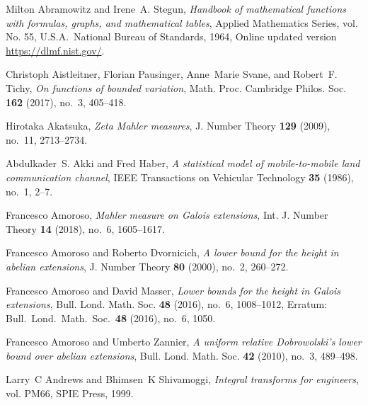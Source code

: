 \documentclass[12pt,reqno]{amsart}
\theoremstyle{definition}
\theoremstyle{plain}
\theoremstyle{definition}
\begin{document}

\providecommand{\bysame}{\leavevmode\hbox to3em{\hrulefill}\thinspace}
\providecommand{\MR}{\relax\ifhmode\unskip\space\fi MR }
\providecommand{\MRhref}[2]{%
  \href{http://www.ams.org/mathscinet-getitem?mr=#1}{#2}
}
\providecommand{\href}[2]{#2}
\begin{thebibliography}{100}

Milton Abramowitz and Irene~A. Stegun, \emph{Handbook of mathematical functions
  with formulas, graphs, and mathematical tables}, Applied Mathematics Series,
  vol. No. 55, U.S.A.~National Bureau of Standards, 1964, Online updated
  version \url{https://dlmf.nist.gov/}.

Christoph Aistleitner, Florian Pausinger, Anne~Marie Svane, and Robert~F.
  Tichy, \emph{On functions of bounded variation}, Math. Proc. Cambridge
  Philos. Soc. \textbf{162} (2017), no.~3, 405--418.

Hirotaka Akatsuka, \emph{Zeta {M}ahler measures}, J. Number Theory \textbf{129}
  (2009), no.~11, 2713--2734.

Abdulkader~S. Akki and Fred Haber, \emph{A statistical model of
  mobile-to-mobile land communication channel}, IEEE Transactions on Vehicular
  Technology \textbf{35} (1986), no.~1, 2--7.

Francesco Amoroso, \emph{Mahler measure on {G}alois extensions}, Int. J. Number
  Theory \textbf{14} (2018), no.~6, 1605--1617.

Francesco Amoroso and Roberto Dvornicich, \emph{A lower bound for the height in
  abelian extensions}, J. Number Theory \textbf{80} (2000), no.~2, 260--272.

Francesco Amoroso and David Masser, \emph{Lower bounds for the height in
  {G}alois extensions}, Bull. Lond. Math. Soc. \textbf{48} (2016), no.~6,
  1008--1012, Erratum: Bull.~Lond.~Math.~Soc.\ \textbf{48} (2016), no.~6, 1050.

Francesco Amoroso and Umberto Zannier, \emph{A uniform relative {D}obrowolski's
  lower bound over abelian extensions}, Bull. Lond. Math. Soc. \textbf{42}
  (2010), no.~3, 489--498.

Larry~C Andrews and Bhimsen~K Shivamoggi, \emph{Integral transforms for
  engineers}, vol. PM66, SPIE Press, 1999.


\end{thebibliography}
\end{document}

